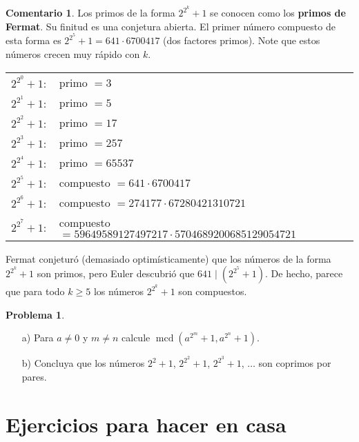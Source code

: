 \documentclass{article}
\DeclareMathOperator{\mcd}{mcd}
\theoremstyle{definition}
\newtheorem{problema}{Problema}
\newtheorem*{comentario}{Comentario}
\begin{document}
\begin{comentario}
  Los primos de la forma $2^{2^k} + 1$ se conocen como los
  \textbf{primos de Fermat}. Su finitud es una conjetura abierta.
  El primer número compuesto de esta forma es $2^{2^5}+1 = 641\cdot 6700417$
  (dos factores primos). Note que estos números crecen muy rápido con $k$.

    \begin{center}
      \begin{tabular}{ll}
        $2^{2^0} + 1\colon$ & primo $= 3$ \\
        $2^{2^1} + 1\colon$ & primo $= 5$ \\
        $2^{2^2} + 1\colon$ & primo $= 17$ \\
        $2^{2^3} + 1\colon$ & primo $= 257$ \\
        $2^{2^4} + 1\colon$ & primo $= 65537$ \\
        $2^{2^5} + 1\colon$ & compuesto $= 641\cdot 6700417$ \\
        $2^{2^6} + 1\colon$ & compuesto $= 274177\cdot 67280421310721$ \\
        $2^{2^7} + 1\colon$ & compuesto $= 59649589127497217\cdot 5704689200685129054721$
      \end{tabular}
    \end{center}

    Fermat conjeturó (demasiado optimísticamente) que los números de la forma
    $2^{2^k} + 1$ son primos, pero Euler descubrió que
    $641 \mid (2^{2^5} + 1)$. De hecho, parece que para todo $k \ge 5$ los
    números $2^{2^k} + 1$ son compuestos.
\end{comentario}

\ifdefined\solutions
\else
\pagebreak
\fi

\begin{problema}
  ~

  \begin{enumerate}
  \item[a)] Para $a \ne 0$ y $m \ne n$ calcule $\mcd (a^{2^m} + 1, a^{2^n} + 1)$.

  \item[b)] Concluya que los números $2^2 + 1$, $2^{2^2} + 1$, $2^{2^3} + 1$,
    $\ldots$ son coprimos por pares.
  \end{enumerate}
\end{problema}

\pagebreak

\section*{Ejercicios para hacer en casa}
\end{document}
